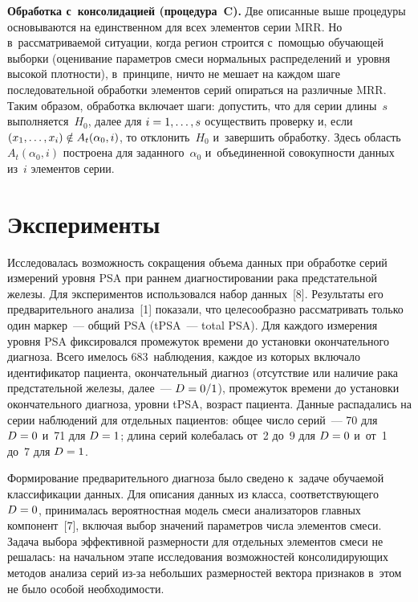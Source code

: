 \begin{multicols}{2}
\textbf{Обработка с~консолидацией (процедура~C).} Две описанные 
выше процедуры основываются на единственном для всех элементов серии 
MRR. Но в~рассматриваемой ситуации, когда регион строится с~помощью 
обучающей выборки (оценивание параметров смеси нормальных 
распределений и~уровня высокой плотности), в~принципе, ничто не мешает на 
каждом шаге последовательной обработки элементов серий опираться на 
различные MRR. Таким образом, обработка 
включает шаги: допустить, что для серии длины~$s$ выполняется~$H_0$, 
далее для $i\hm=1,\ldots ,s$ осуществить проверку и, если$(x_1,\ldots, 
x_i)\hm\notin A_t(\alpha_0,i)$, то отклонить~$H_0$ и~завершить обработку. 
Здесь область $A_t(\alpha_0,i)$ по\-стро\-ена для заданного~$\alpha_0$ 
и~объединенной совокупности данных из~$i$ элементов серии.
     
\section{Эксперименты}

     Исследовалась возможность сокращения объема данных при обработке 
серий измерений уровня PSA при 
раннем диагностировании рака предстательной железы. Для экспериментов 
использовался набор данных~[8]. Результаты его предварительного анализа~[1] 
показали, что целесообразно рас\-смат\-ри\-вать только один маркер~--- общий PSA 
(tPSA~--- total PSA). Для каждого измерения уровня PSA фиксировался промежуток 
времени до установки окончательного диагноза. Всего имелось 
683~наблюдения, каждое из которых включало идентификатор пациента, 
окончательный диагноз (отсутствие или наличие рака предстательной железы, 
далее~--- $D\hm=0/1$), промежуток времени до установки окончательного 
диагноза, уровни tPSA, возраст пациента. Данные распадались на серии 
наблюдений для отдельных пациентов: общее число серий~--- 70 для $D\hm=0$ 
и~71 для $D\hm=1$; длина серий колебалась от~2 до~9 для $D\hm=0$ и~от~1 
до~7 для $D\hm=1$. 
     
     Формирование предварительного диагноза было сведено к~задаче 
обучаемой классификации данных. Для описания данных из класса, 
соответствующего $D\hm=0$, принималась вероятностная \mbox{модель} смеси 
анализаторов главных компонент~[7], включая выбор значений параметров 
чис\-ла элементов смеси. Задача выбора эффективной раз\-мер\-ности для 
отдельных элементов смеси не решалась: на начальном этапе исследования 
возможностей консолидирующих методов анализа серий из-за небольших 
размерностей вектора признаков в~этом не было особой необходимости. 
     

\end{multicols}
